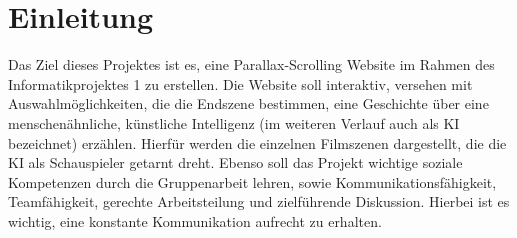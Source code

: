 \chapter{Einleitung\label{cha:introduction}}
Das Ziel dieses Projektes ist es, eine Parallax-Scrolling Website im Rahmen des Informatikprojektes 1 zu erstellen. Die Website soll interaktiv, versehen mit Auswahlmöglichkeiten, die die Endszene bestimmen, eine Geschichte über eine menschenähnliche, künstliche Intelligenz (im weiteren Verlauf auch als KI bezeichnet) erzählen. Hierfür werden die einzelnen Filmszenen dargestellt, die die KI als Schauspieler getarnt dreht.
Ebenso soll das Projekt wichtige soziale Kompetenzen durch die Gruppenarbeit lehren, sowie Kommunikationsfähigkeit, Teamfähigkeit, gerechte Arbeitsteilung und zielführende Diskussion. Hierbei ist es wichtig, eine konstante Kommunikation aufrecht zu erhalten.